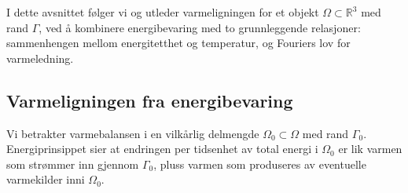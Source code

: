 I dette avsnittet følger vi \cite[1.3 Physical Derivation of the Heat Equation]{LaT03} og utleder varmeligningen for et objekt \( \Omega \subset \mathbb{R}^3 \) med rand \( \Gamma \), ved å kombinere energibevaring med to grunnleggende relasjoner: sammenhengen mellom energitetthet og temperatur, og Fouriers lov for varmeledning.

\subsection*{Varmeligningen fra energibevaring}

Vi betrakter varmebalansen i en vilkårlig delmengde \( \Omega_0 \subset \Omega \) med rand \( \Gamma_0 \). Energiprinsippet sier at endringen per tidsenhet av total energi i \( \Omega_0 \) er lik varmen som strømmer inn gjennom \( \Gamma_0 \), pluss varmen som produseres av eventuelle varmekilder inni \( \Omega_0 \).

